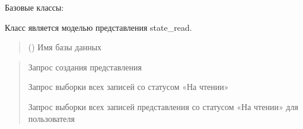 \documentclass[letterpaper,10pt,russian]{sphinxmanual}
\begin{document}
\begin{fulllineitems}
\label{\detokenize{database.sqlite3_interface.views:database.sqlite3_interface.views.view_in_read.ViewInRead}}
\pysigstartsignatures
{}
\pysigstopsignatures
\sphinxAtStartPar
Базовые классы: {\hyperref[\detokenize{database.sqlite3_interface.views:database.sqlite3_interface.views.view.View}]{}}

\sphinxAtStartPar
Класс является моделью представления state\_read.
\begin{quote}\begin{description}
\sphinxAtStartPar
{} () \textendash{} Имя базы данных

\end{description}\end{quote}
\begin{description}
\begin{quote}\begin{description}
\sphinxAtStartPar
Запрос создания представления

\sphinxAtStartPar
Запрос выборки всех записей со статусом «На чтении»

\sphinxAtStartPar
Запрос выборки всех записей представления со статусом «На чтении» для пользователя

\end{description}\end{quote}


\end{description}
\end{fulllineitems}
\end{document}
